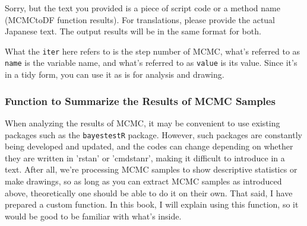 \documentclass{ltjsbook}
\begin{document}
Sorry, but the text you provided is a piece of script code or a method name (MCMCtoDF function results). For translations, please provide the actual Japanese text.
The output results will be in the same format for both.

What the \verb|iter| here refers to is the step number of MCMC, what's referred to as \verb|name| is the variable name, and what's referred to as \verb|value| is its value. Since it's in a tidy form, you can use it as is for analysis and drawing.

\subsubsection{Function to Summarize the Results of MCMC Samples}
When analyzing the results of MCMC, it may be convenient to use existing packages such as the \verb|bayestestR| package.
However, such packages are constantly being developed and updated, and the codes can change depending on whether they are written in 'rstan' or 'cmdstanr', making it difficult to introduce in a text. After all, we're processing MCMC samples to show descriptive statistics or make drawings, so as long as you can extract MCMC samples as introduced above, theoretically one should be able to do it on their own. That said, I have prepared a custom function. In this book, I will explain using this function, so it would be good to be familiar with what's inside.
\end{document}
